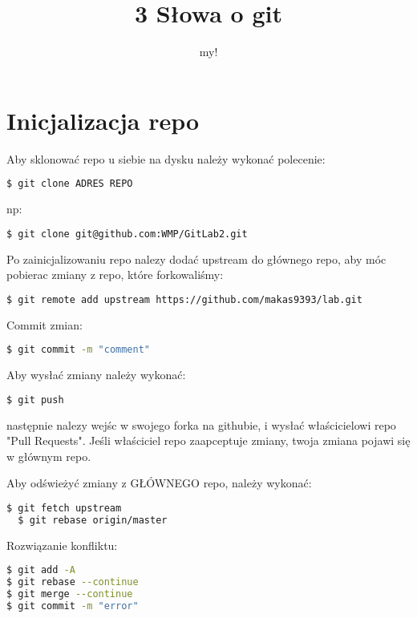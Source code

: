 ﻿\documentclass[12pt,a4paper]{book}
\author{my!}
\title{3 Słowa o git}
\begin{document}
\maketitle

\chapter{Inicjalizacja repo}
Aby sklonować repo u siebie na dysku należy wykonać polecenie:
\begin{lstlisting}[language=bash]
  $ git clone ADRES REPO
\end{lstlisting}
np:
\begin{lstlisting}[language=bash]
  $ git clone git@github.com:WMP/GitLab2.git
\end{lstlisting}
Po zainicjalizowaniu repo nalezy dodać upstream do głównego repo, aby móc pobierac zmiany z repo, które forkowaliśmy:
\begin{lstlisting}[language=bash]
  $ git remote add upstream https://github.com/makas9393/lab.git
\end{lstlisting}

Commit zmian:
\begin{lstlisting}[language=bash]
  $ git commit -m "comment"
\end{lstlisting}

Aby wysłać zmiany należy wykonać:
\begin{lstlisting}[language=bash]
  $ git push
\end{lstlisting}
następnie nalezy wejśc w swojego forka na githubie, i wysłać właścicielowi repo "Pull Requests". Jeśli właściciel repo zaapceptuje zmiany, twoja zmiana pojawi się w głównym repo. 

Aby odświeżyć zmiany z GŁÓWNEGO repo, należy wykonać:
\begin{lstlisting}[language=bash]
  $ git fetch upstream
  $ git rebase origin/master
\end{lstlisting}

Rozwiązanie konfliktu:
\begin{lstlisting}[language=bash]
$ git add -A
$ git rebase --continue
$ git merge --continue
$ git commit -m "error"
\end{lstlisting}
\end{document}
